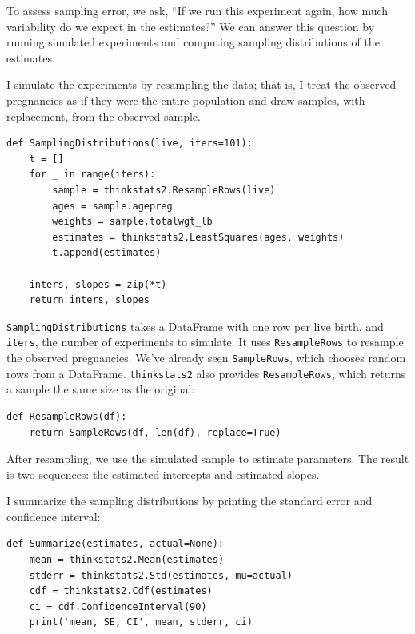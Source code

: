 \documentclass[12pt]{book}
\begin{document}
To assess sampling error, we ask, ``If we run this experiment again,
how much variability do we expect in the estimates?''  We can
answer this question by running simulated experiments and computing
sampling distributions of the estimates.

I simulate the experiments by resampling the data; that is, I treat
the observed pregnancies as if they were the entire population
and draw samples, with replacement, from the observed sample.

\begin{verbatim}
def SamplingDistributions(live, iters=101):
    t = []
    for _ in range(iters):
        sample = thinkstats2.ResampleRows(live)
        ages = sample.agepreg
        weights = sample.totalwgt_lb
        estimates = thinkstats2.LeastSquares(ages, weights)
        t.append(estimates)

    inters, slopes = zip(*t)
    return inters, slopes
\end{verbatim}

\verb"SamplingDistributions" takes a DataFrame with one row per live
birth, and \verb"iters", the number of experiments to simulate.  It
uses \verb"ResampleRows" to resample the observed pregnancies.  We've
already seen \verb"SampleRows", which chooses random rows from a
DataFrame.  \verb"thinkstats2" also provides \verb"ResampleRows", which
returns a sample the same size as the original:

\begin{verbatim}
def ResampleRows(df):
    return SampleRows(df, len(df), replace=True)
\end{verbatim}

After resampling, we use the simulated sample to estimate parameters.
The result is two sequences: the estimated intercepts and estimated
slopes.

I summarize the sampling distributions by printing the standard
error and confidence interval:

\begin{verbatim}
def Summarize(estimates, actual=None):
    mean = thinkstats2.Mean(estimates)
    stderr = thinkstats2.Std(estimates, mu=actual)
    cdf = thinkstats2.Cdf(estimates)
    ci = cdf.ConfidenceInterval(90)
    print('mean, SE, CI', mean, stderr, ci)
\end{verbatim}
\end{document}
